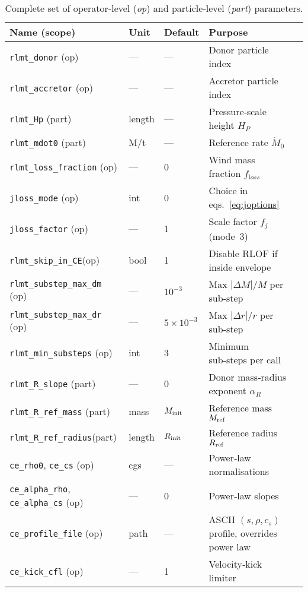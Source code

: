 \documentclass[11pt]{article}
\begin{document}
\begin{table}[h]
\centering\footnotesize
\caption{Complete set of operator‐level (\textit{op}) and
particle‑level (\textit{part}) parameters.}
\label{tab:params}
\begin{tabular}{@{}lllll@{}}
\toprule
Name (scope) & Unit & Default & Purpose \\
\midrule
\texttt{rlmt\_donor}      (op)   & —        & — & Donor particle index\\
\texttt{rlmt\_accretor}   (op)   & —        & — & Accretor particle index\\
\texttt{rlmt\_Hp}         (part) & length   & — & Pressure‐scale height $H_P$\\
\texttt{rlmt\_mdot0}      (part) & M/t      & — & Reference rate $\dot M_0$\\[0.2em]
%
\texttt{rlmt\_loss\_fraction} (op) & —      & 0 & Wind mass fraction $f_{\mathrm loss}$\\
\texttt{jloss\_mode}      (op)   & int      & 0 & Choice in eqs.~\eqref{eq:joptions}\\
\texttt{jloss\_factor}    (op)   & —        & 1 & Scale factor $f_j$ (mode 3)\\
\texttt{rlmt\_skip\_in\_CE}(op)  & bool     & 1 & Disable RLOF if inside envelope\\[0.2em]
%
\texttt{rlmt\_substep\_max\_dm} (op) & —    & $10^{-3}$ & Max $|\Delta M|/M$ per sub‑step\\
\texttt{rlmt\_substep\_max\_dr} (op) & —    & $5\times10^{-3}$ & Max $|\Delta r|/r$ per sub‑step\\
\texttt{rlmt\_min\_substeps}    (op) & int  & 3 & Minimum sub‑steps per call\\[0.2em]
%
\texttt{rlmt\_R\_slope}      (part) & —     & 0 & Donor mass‑radius exponent $\alpha_R$\\
\texttt{rlmt\_R\_ref\_mass}  (part) & mass  & $M_{\rm init}$ & Reference mass $M_{\rm ref}$\\
\texttt{rlmt\_R\_ref\_radius}(part) & length& $R_{\rm init}$ & Reference radius $R_{\rm ref}$\\[0.2em]
%
\texttt{ce\_rho0}, \texttt{ce\_cs}  (op) & cgs & — & Power‑law normalisations\\
\texttt{ce\_alpha\_rho}, \texttt{ce\_alpha\_cs} (op) & — & 0 & Power‑law slopes\\
\texttt{ce\_profile\_file}  (op) & path & — & ASCII $(s,\rho,c_s)$ profile, overrides power law\\
\texttt{ce\_kick\_cfl}      (op) & — & 1 & Velocity‑kick limiter\\

\end{tabular}
\end{table}
\end{document}
